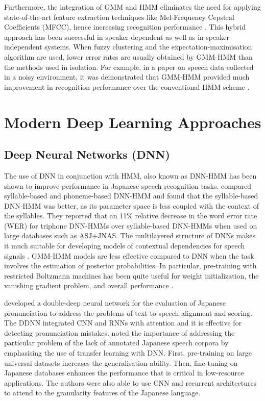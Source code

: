 Furthermore, the integration of GMM and HMM eliminates the need for applying state-of-the-art feature extraction techniques like Mel-Frequency Cepstral Coefficients (MFCC), hence increasing recognition performance \parencite{nicita1}. This hybrid approach has been successful in speaker-dependent as well as in speaker-independent systems. When fuzzy clustering and the expectation-maximisation algorithm are used, lower error rates are usually obtained by GMM-HMM than the methods used in isolation. For example, in a paper on speech data collected in a noisy environment, it was demonstrated that GMM-HMM provided much improvement in recognition performance over the conventional HMM scheme \parencite{taheri2006fuzzy, nicita1}.


\section{Modern Deep Learning Approaches}
\subsection{Deep Neural Networks (DNN)}
The use of DNN in conjunction with HMM, also known as DNN-HMM has been shown to improve performance in Japanese speech recognition tasks. \textcite{seki2014comparison} compared syllable-based and phoneme-based DNN-HMM and found that the syllable-based DNN-HMM was better, as its parameter space is less coupled with the context of the syllables. They reported that an 11\% relative decrease in the word error rate (WER) for triphone DNN-HMMs over syllable-based DNN-HMMs when used on large databases such as ASJ+JNAS. The multilayered structure of DNNs makes it much suitable for developing models of contextual dependencies for speech signals \parencite{hojo2018dnn}. GMM-HMM models are less effective compared to DNN when the task involves the estimation of posterior probabilities. In particular, pre-training with restricted Boltzmann machines has been quite useful for weight initialization, the vanishing gradient problem, and overall performance \parencite{Mimura2013CSJ}.

\textcite{mu2020japanese} developed a double-deep neural network for the evaluation of Japanese pronunciation to address the problems of text-to-speech alignment and scoring. The DDNN integrated CNN and RNNs with attention and it is effective for detecting pronunciation mistakes. \textcite{lin2017dnn} noted the importance of addressing the particular problem of the lack of annotated Japanese speech corpora by emphasising the use of transfer learning with DNN. First, pre-training on large universal datasets increases the generalisation ability. Then, fine-tuning on Japanese databases enhances the performance that is critical in low-resource applications. The authors were also able to use CNN and recurrent architectures to attend to the granularity features of the Japanese language.

